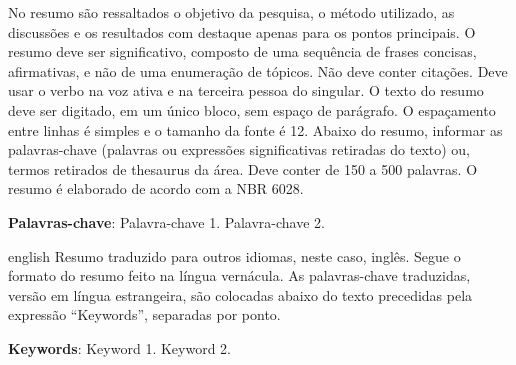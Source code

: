 \documentclass[
	12pt,				%
	oneside,			%
	a4paper,			%
	chapter=TITLE,		%
	section=TITLE,		%
	english,			%
	brazil				%
	]{abntex2}
\begin{document}

\setlength{\absparsep}{18pt} %
\begin{resumo}
	\SingleSpacing
  No resumo são ressaltados o objetivo da pesquisa, o método utilizado, as discussões e os resultados com destaque apenas para os pontos principais. O resumo deve ser significativo, composto de uma sequência de frases concisas, afirmativas, e não de uma enumeração de tópicos. Não deve conter citações. Deve usar o verbo na voz ativa e na terceira pessoa do singular. O texto do resumo deve ser digitado, em um único bloco, sem espaço de parágrafo. O espaçamento entre linhas é simples e o tamanho da fonte é 12. Abaixo do resumo, informar as palavras-chave (palavras ou expressões significativas retiradas do texto) ou, termos retirados de thesaurus da área. Deve conter de 150 a 500 palavras. O resumo é elaborado de acordo com a NBR 6028.

  \textbf{Palavras-chave}:
    Palavra-chave 1.
    Palavra-chave 2.
  \end{resumo}
\begin{resumo}[Abstract]
	\SingleSpacing
	\begin{otherlanguage*}{english}
		Resumo traduzido para outros idiomas, neste caso, inglês. Segue o formato do resumo feito na língua vernácula. As palavras-chave traduzidas, versão em língua estrangeira, são colocadas abaixo do texto precedidas pela expressão ``Keywords'', separadas por ponto.

		\textbf{Keywords}:
	      Keyword 1.
        Keyword 2.
    	\end{otherlanguage*}
\end{resumo}
%
%
%
\end{document}
